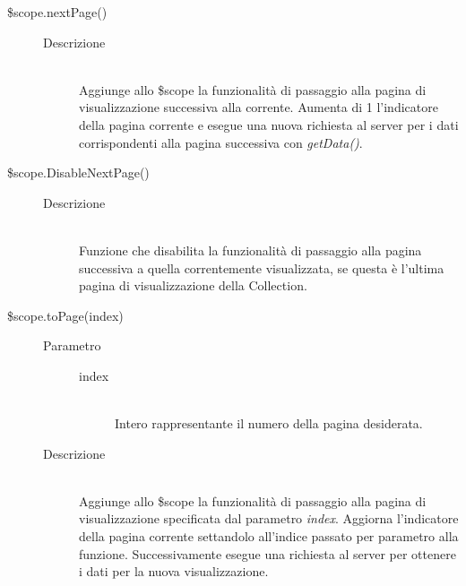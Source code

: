 \begin{description}
\begin{description}
  \item[\$scope.nextPage()] \hfill
  \begin{description}
  	\item[Descrizione] \hfill \\  
  Aggiunge allo \$scope la funzionalità di passaggio alla pagina di visualizzazione successiva alla corrente.
  Aumenta di 1 l'indicatore della pagina corrente e esegue una nuova richiesta al server per i dati corrispondenti alla pagina successiva con \textit{getData()}.
    \end{description}

  \item[\$scope.DisableNextPage()] \hfill
  \begin{description}
  	\item[Descrizione] \hfill \\
  	Funzione che disabilita la funzionalità di passaggio alla pagina successiva a quella correntemente visualizzata, se questa è l'ultima pagina di visualizzazione della Collection.
  \end{description}
  
  \item[\$scope.toPage(index)] \hfill
  \begin{description}
  	\item[Parametro] \hfill
  		\begin{description}
  			\item[index] \hfill \\
  			Intero rappresentante il numero della pagina desiderata.
       \end{description}
  	\item[Descrizione] \hfill \\
   Aggiunge allo \$scope la funzionalità di passaggio alla pagina di visualizzazione specificata dal parametro \textit{index}.
  Aggiorna l'indicatore della pagina corrente settandolo all'indice passato per parametro alla funzione.
  Successivamente esegue una richiesta al server per ottenere i dati per la nuova visualizzazione.
    \end{description}
 \end{description}
\end{description}


